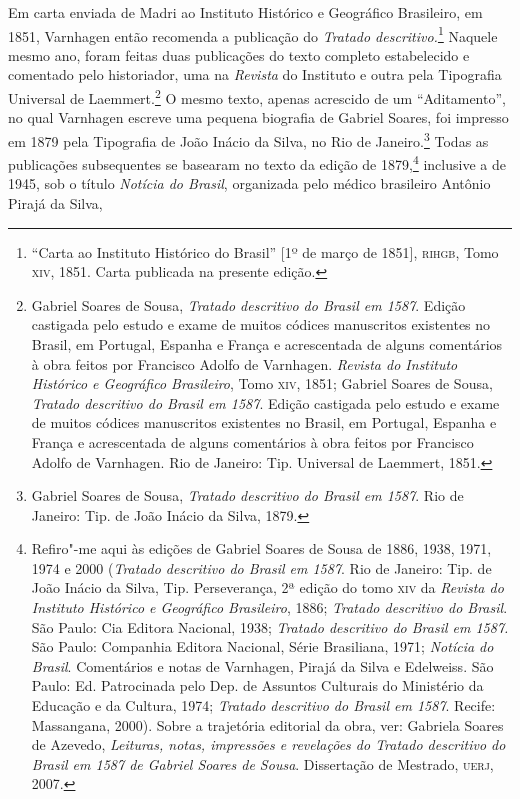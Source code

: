 Em carta enviada de Madri ao Instituto Histórico e Geográfico
Brasileiro, em 1851, Varnhagen então recomenda a publicação do
\textit{Tratado descritivo.}\footnote{ “Carta ao Instituto Histórico do
Brasil” [1º de março de 1851], \textsc{rihgb}, Tomo \textsc{xiv}, 1851. Carta publicada
na presente edição.} Naquele mesmo ano, foram feitas duas publicações
do texto completo estabelecido e comentado pelo historiador,
uma  na \textit{Revista} do  Instituto e outra pela
Tipografia Universal de Laemmert.\footnote{ Gabriel Soares de Sousa, \textit{Tratado descritivo
do Brasil em 1587}. Edição castigada pelo estudo e exame de muitos
códices manuscritos existentes no Brasil, em Portugal, Espanha e França
e acrescentada de alguns comentários à obra feitos por Francisco Adolfo
de Varnhagen. \textit{Revista do Instituto Histórico e Geográfico Brasileiro},
Tomo \textsc{xiv}, 1851; Gabriel Soares de Sousa, \textit{Tratado descritivo do Brasil em 1587}. Edição
castigada pelo estudo e exame de muitos códices manuscritos existentes
no Brasil, em Portugal, Espanha e França e acrescentada de alguns
comentários à obra feitos por Francisco Adolfo de Varnhagen. Rio de
Janeiro: Tip. Universal de Laemmert, 1851.} O mesmo texto, apenas
acrescido de um “Aditamento”, no qual Varnhagen escreve uma pequena
biografia de Gabriel Soares, foi impresso em 1879 pela Tipografia de
João Inácio da Silva, no Rio de Janeiro.\footnote{ Gabriel Soares de
Sousa, \textit{Tratado descritivo do Brasil em 1587}. Rio de Janeiro:
Tip. de João Inácio da Silva, 1879.} Todas as publicações subsequentes
se basearam no texto da edição de 1879,\footnote{ Refiro"-me aqui às
edições de Gabriel Soares de Sousa de 1886, 1938, 1971, 1974 e 2000
(\textit{Tratado descritivo do Brasil em 1587}. Rio de Janeiro: Tip. de
João Inácio da Silva, Tip. Perseverança, 2ª edição do tomo \textsc{xiv} da
\textit{Revista do Instituto Histórico e Geográfico Brasileiro}, 1886;
\textit{Tratado descritivo do Brasil}. São Paulo: Cia Editora Nacional,
1938; \textit{Tratado descritivo do Brasil em 1587.} São Paulo:
Companhia Editora Nacional, Série Brasiliana, 1971;  \textit{Notícia do
Brasil}. Comentários e notas de Varnhagen, Pirajá da Silva e Edelweiss.
São Paulo: Ed. Patrocinada pelo Dep. de Assuntos Culturais do
Ministério da Educação e da Cultura, 1974; \textit{Tratado descritivo
do Brasil em 1587}. Recife: Massangana, 2000). Sobre a
trajetória editorial da obra, ver: Gabriela Soares de Azevedo,
\textit{Leituras, notas, impressões e revelações do Tratado descritivo
do Brasil em 1587 de Gabriel Soares de Sousa}. Dissertação de Mestrado,
\textsc{uerj}, 2007.} inclusive a de 1945, sob o título \textit{Notícia do
Brasil}, organizada pelo médico brasileiro Antônio Pirajá da Silva,
